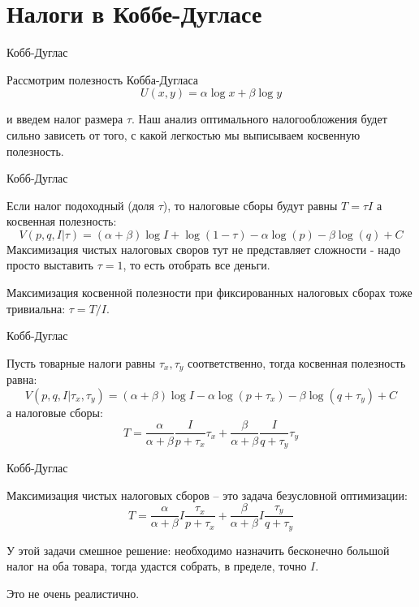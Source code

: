 \documentclass{beamer}
\begin{document}
\section{Налоги в Коббе-Дугласе}

\begin{frame}{Кобб-Дуглас}

Рассмотрим полезность Кобба-Дугласа 
$$U(x,y) = \alpha \log x + \beta \log y$$

и введем налог размера $\tau$. Наш анализ оптимального налогообложения будет сильно зависеть от того, с какой легкостью мы выписываем косвенную полезность.

\end{frame}

\begin{frame}{Кобб-Дуглас}

Если налог подоходный (доля $\tau$), то налоговые сборы будут равны $T = \tau I$ а косвенная полезность:
$$ V(p,q,I|\tau) = (\alpha + \beta)\log I + \log (1-\tau) - \alpha \log(p) - \beta \log (q) + C$$
Максимизация чистых налоговых своров тут не представляет сложности - надо просто выставить $\tau = 1$, то есть отобрать все деньги. 

Максимизация косвенной полезности при фиксированных налоговых сборах тоже тривиальна: $\tau = T/I$.

\end{frame}

\begin{frame}{Кобб-Дуглас}

Пусть товарные налоги равны $\tau_x, \tau_y$ соответственно, тогда косвенная полезность равна:
$$V(p,q,I|\tau_x, \tau_y) = (\alpha + \beta)\log I - \alpha \log(p + \tau_x) - \beta \log (q + \tau_y) + C$$
а налоговые сборы:
$$T = \frac{\alpha}{\alpha + \beta} \frac{I}{p+\tau_x}\tau_x + \frac{\beta}{\alpha + \beta} \frac{I}{q+\tau_y} \tau_y$$

\end{frame}

\begin{frame}{Кобб-Дуглас}

Максимизация чистых налоговых сборов – это задача безусловной оптимизации:
$$T =  \frac{\alpha}{\alpha + \beta} I \frac{\tau_x}{p+\tau_x} + \frac{\beta}{\alpha + \beta} I \frac{\tau_y}{q+\tau_y}$$

У этой задачи смешное решение: необходимо назначить бесконечно большой налог на оба товара, тогда удастся собрать, в пределе, точно $I$. 

Это не очень реалистично.

\end{frame}
\end{document}
